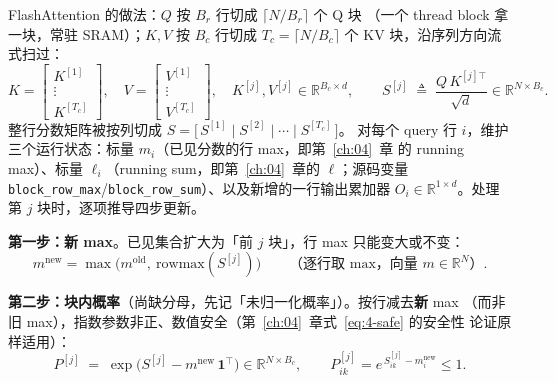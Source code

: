 FlashAttention 的做法：$Q$ 按 $B_r$ 行切成 $\lceil N/B_r \rceil$ 个 Q 块
（一个 thread block 拿一块，常驻 SRAM）；$K,V$ 按 $B_c$ 行切成 $T_c = \lceil N/B_c
\rceil$ 个 KV 块，沿序列方向流式扫过：
\begin{equation}
  K = \begin{bmatrix} K^{[1]} \\ \vdots \\ K^{[T_c]} \end{bmatrix},\quad
  V = \begin{bmatrix} V^{[1]} \\ \vdots \\ V^{[T_c]} \end{bmatrix},\quad
  K^{[j]}, V^{[j]} \in \mathbb{R}^{B_c \times d},
  \qquad
  S^{[j]} \;\triangleq\; \frac{Q\,K^{[j]\top}}{\sqrt{d}} \in \mathbb{R}^{N \times B_c} .
  \label{eq:15-blocks}
\end{equation}
整行分数矩阵被按列切成 $S = \bigl[\,S^{[1]} \mid S^{[2]} \mid \cdots \mid S^{[T_c]}\,\bigr]$。
对每个 query 行 $i$，维护三个运行状态：标量 $m_i$（已见分数的行 max，即第~\ref{ch:04}~章
的 running max）、标量 $\ell_i$（running sum，即第~\ref{ch:04}~章的 $\ell$；源码变量
\texttt{block\_\allowbreak{}row\_\allowbreak{}max}/\texttt{block\_\allowbreak{}row\_\allowbreak{}sum}）、以及新增的一行输出累加器
$O_i \in \mathbb{R}^{1 \times d}$。处理第 $j$ 块时，逐项推导四步更新。

\textbf{第一步：新 max}。已见集合扩大为「前 $j$ 块」，行 max 只能变大或不变：
\begin{equation}
  m^{\mathrm{new}} = \max\bigl(m^{\mathrm{old}},\ \mathrm{rowmax}(S^{[j]})\bigr)
  \qquad\text{（逐行取 max，向量 } m \in \mathbb{R}^{N}\text{）} .
  \label{eq:15-upd-m}
\end{equation}

\textbf{第二步：块内概率}（尚缺分母，先记「未归一化概率」）。按行减去\textbf{新} max
（而非旧 max），指数参数非正、数值安全（第~\ref{ch:04}~章式~\ref{eq:4-safe} 的安全性
论证原样适用）：
\begin{equation}
  P^{[j]} \;=\; \exp\bigl(S^{[j]} - m^{\mathrm{new}}\,\mathbf{1}^{\top}\bigr)
  \in \mathbb{R}^{N \times B_c},
  \qquad P^{[j]}_{ik} = e^{\,S_{ik}^{[j]} - m^{\mathrm{new}}_i} \le 1 .
  \label{eq:15-upd-p}
\end{equation}

